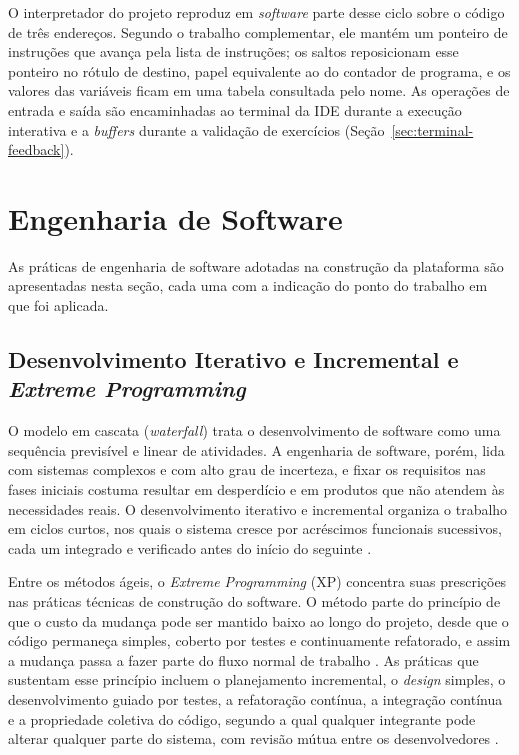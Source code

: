 O interpretador do projeto reproduz em \textit{software} parte desse ciclo sobre o código de três endereços. Segundo o trabalho complementar, ele mantém um ponteiro de instruções que avança pela lista de instruções; os saltos reposicionam esse ponteiro no rótulo de destino, papel equivalente ao do contador de programa, e os valores das variáveis ficam em uma tabela consultada pelo nome. As operações de entrada e saída são encaminhadas ao terminal da IDE durante a execução interativa e a \textit{buffers} durante a validação de exercícios (Seção~\ref{sec:terminal-feedback}).

\section{Engenharia de Software}
\label{sec:engenharia-software}

As práticas de engenharia de software adotadas na construção da plataforma são apresentadas nesta seção, cada uma com a indicação do ponto do trabalho em que foi aplicada.

\subsection{Desenvolvimento Iterativo e Incremental e \textit{Extreme Programming}}
\label{subsec:xp}

O modelo em cascata (\textit{waterfall}) trata o desenvolvimento de software como uma sequência previsível e linear de atividades. A engenharia de software, porém, lida com sistemas complexos e com alto grau de incerteza, e fixar os requisitos nas fases iniciais costuma resultar em desperdício e em produtos que não atendem às necessidades reais. O desenvolvimento iterativo e incremental organiza o trabalho em ciclos curtos, nos quais o sistema cresce por acréscimos funcionais sucessivos, cada um integrado e verificado antes do início do seguinte \cite{agile2012,beck2004}.

Entre os métodos ágeis, o \textit{Extreme Programming} (XP) concentra suas prescrições nas práticas técnicas de construção do software. O método parte do princípio de que o custo da mudança pode ser mantido baixo ao longo do projeto, desde que o código permaneça simples, coberto por testes e continuamente refatorado, e assim a mudança passa a fazer parte do fluxo normal de trabalho \cite{beck2004,wildt2015}. As práticas que sustentam esse princípio incluem o planejamento incremental, o \textit{design} simples, o desenvolvimento guiado por testes, a refatoração contínua, a integração contínua e a propriedade coletiva do código, segundo a qual qualquer integrante pode alterar qualquer parte do sistema, com revisão mútua entre os desenvolvedores \cite{beck2004,wildt2015}.

